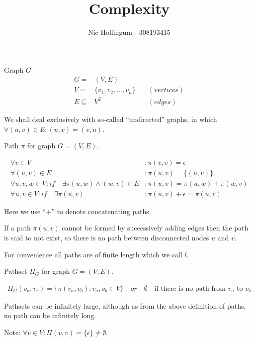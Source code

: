 \documentclass{article}
\author{Nic Hollingum - 308193415}
\title{Complexity}
\begin{document}
\begin{definition}
Graph $G$
\begin{align}
	\nonumber G = & (V,E) \\
	\nonumber V = & \{v_1, v_2, ..., v_n\} \quad & (vertices)\\
	\nonumber E \subseteq & V^2 & (edges)
\end{align}

We shall deal exclusively with so-called ``undirected'' graphs, in which $\forall (u,v) \in E : (u,v) = (v,u)$.
\end{definition}

\begin{definition}
Path $\pi$ for graph $G = (V,E)$.

\begin{align}
	\nonumber \forall v \in V & : \pi(v, v) = \epsilon \\
	\nonumber \forall (u,v) \in E & : \pi(u, v) = \{(u, v)\} \\
	\nonumber \forall u, v, w \in V : if \quad \exists \pi(u, w) \wedge (w, v) \in E & : \pi(u, v) = \pi(u,w) + \pi(w, v)\\
	\nonumber \forall u, v \in V : if \quad \exists \pi(u, v) & : \pi(u, v) + \epsilon = \pi(u, v)
\end{align}

Here we use ``$+$'' to denote concatenating paths.

If a path $\pi(u, v)$ cannot be formed by successively adding edges then the path is said to not exist, so there is no path between disconnected nodes $u$ and $v$.

For convenience all paths are of finite length which we call $l$.
\end{definition}

\begin{definition}
Pathset $\Pi_G$ for graph $G = (V,E)$.

\begin{align}
	\nonumber \Pi_G(v_a, v_b) = \{\pi(v_a, v_b) : v_a, v_b \in V\} \quad or \quad \emptyset \quad \mbox{if there is no path from $v_a$ to $v_b$}
\end{align}

Pathsets can be infinitely large, although as from the above definition of paths, no path can be infinitely long.

Note: $\forall v \in V : \Pi(v, v) = \{\epsilon\} \neq \emptyset$.
\end{definition}
\end{document}
